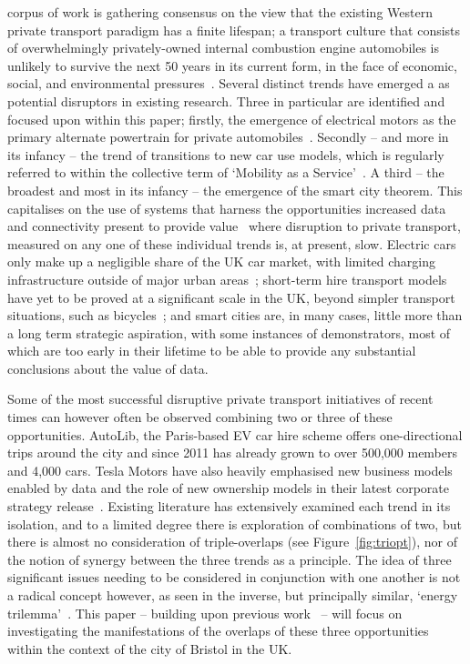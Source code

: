 \documentclass[journal]{IEEEtran}
\begin{document}
 corpus of work is gathering consensus on
the view that the existing Western private transport paradigm has a
finite lifespan; a transport culture that consists of overwhelmingly
privately-owned internal combustion engine automobiles is unlikely to
survive the next 50 years in its current form, in the face of
economic, social, and environmental
pressures~\cite{lerner:2011,van-audenhove-et-al:2014,black-et-al:2016}.
Several distinct trends have emerged a as potential disruptors in
existing research. Three in particular are identified and focused upon
within this paper; firstly, the emergence of electrical motors as the
primary alternate powertrain for private
automobiles~\cite{paffumi-et-al:2015,gnann-et-al:2015}.  Secondly --
and more in its infancy -- the trend of transitions to new car use
models, which is regularly referred to within the collective term of
`Mobility as a Service'~\cite{tscatapult:2016}. A third -- the
broadest and most in its infancy -- the emergence of the smart city
theorem. This capitalises on the use of systems that harness the
opportunities increased data and connectivity present to provide
value~\cite{townsend:2013,ibm:2014} where disruption to private
transport, measured on any one of these individual trends is, at
present, slow. Electric cars only make up a negligible share of the UK
car market, with limited charging infrastructure outside of major
urban areas~\cite{dft:2008}; short-term hire transport models have
yet to be proved at a significant scale in the UK, beyond simpler
transport situations, such as bicycles~\cite{kamargianni-et-al:2016};
and smart cities are, in many cases, little more than a long term
strategic aspiration, with some instances of demonstrators, most of
which are too early in their lifetime to be able to provide any
substantial conclusions about the value of data.

Some of the most successful disruptive private transport initiatives
of recent times can however often be observed combining two or three
of these opportunities. AutoLib, the Paris-based EV car hire scheme
offers one-directional trips around the city and since 2011 has
already grown to over 500,000 members and 4,000 cars. Tesla Motors
have also heavily emphasised new business models enabled by data and
the role of new ownership models in their latest corporate strategy
release~\cite{musk:2016}. Existing literature has extensively examined
each trend in its isolation, and to a limited degree there is
exploration of combinations of two, but there is almost no
consideration of triple-overlaps (see Figure~\ref{fig:triopt}), nor of
the notion of synergy between the three trends as a principle. The
idea of three significant issues needing to be considered in
conjunction with one another is not a radical concept however, as seen
in the inverse, but principally similar, `energy
trilemma'~\cite{wec:2015}. This paper -- building upon previous
work~\cite{cooper-et-al-sose:2015} -- will focus on investigating the
manifestations of the overlaps of these three opportunities within the
context of the city of Bristol in the UK.
\end{document}
